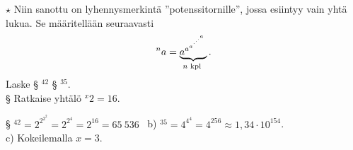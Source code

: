 \begin{tehtavasivu}
\begin{tehtava}
$\star$ Niin sanottu  on lyhennysmerkintä ''potenssitornille'',
jossa esiintyy vain yhtä lukua. Se määritellään seuraavasti
\[^na = \underbrace{{a^{a^{a^{\mathstrut^{.^{.^{.^{a}}}}}}}}}_{n\textrm{ kpl }}. \]
Laske 
§ $^42$  
§ $^35$. \\
§ Ratkaise yhtälö $^x2= 16$.
\begin{vastaus}
§ $^42 = 2^{2^{2^2}}=2^{2^4}=2^{16}=65\ 536$ \
b) $^35 = 4^{4^4} = 4^{256} \approx 1,34 \cdot 10^{154}$. \\
c) Kokeilemalla $x =3$.
\end{vastaus}
\end{tehtava}

\end{tehtavasivu}
